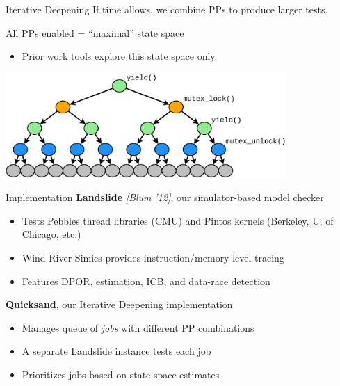 \documentclass[xcolor=dvipsnames]{beamer}
\begin{document}
\begin{frame}{Iterative Deepening}
	If time allows, we combine PPs to produce larger tests.
	\linegap

	All PPs enabled = ``maximal'' state space
	\begin{itemize}
		\item Prior work tools explore this state space only.
	\end{itemize}
	\linegap

	\begin{center}
		\includegraphics[width=0.8\textwidth]{tree3.pdf}
	\end{center}
\end{frame}

\begin{frame}{Implementation}
	\textbf{Landslide} {\em [Blum '12]}, our simulator-based model checker
	\begin{itemize}
		\item Tests Pebbles thread libraries (CMU) and Pintos kernels (Berkeley, U. of Chicago, etc.)
		\item Wind River Simics provides instruction/memory-level tracing
		\item Features DPOR, estimation, ICB, and data-race detection
	\end{itemize}
	\linegap

	{\bf Quicksand}, our Iterative Deepening implementation
	\begin{itemize}
		\item Manages queue of {\em jobs} with different PP combinations
		\item A separate Landslide instance tests each job
		\item Prioritizes jobs based on state space estimates
	\end{itemize}
\end{frame}
\end{document}
